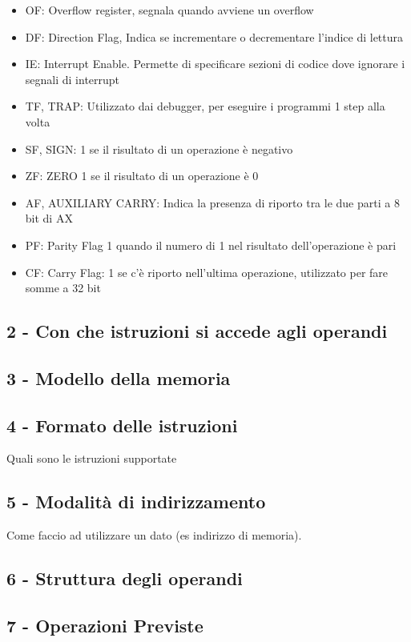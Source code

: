 \documentclass{article}
\begin{document}
\begin{itemize}
    \item OF:
        Overflow register, segnala quando avviene un overflow
    \item DF:
        Direction Flag, Indica se incrementare o decrementare l'indice di lettura
    \item IE:
        Interrupt Enable. Permette di specificare sezioni di codice dove ignorare i segnali di interrupt
    \item TF, TRAP:
        Utilizzato dai debugger, per eseguire i programmi 1 step alla volta
    \item SF, SIGN:
        1 se il risultato di un operazione è negativo
    \item ZF: ZERO
        1 se il risultato di un operazione è 0
    \item AF, AUXILIARY CARRY:
        Indica la presenza di riporto tra le due parti a 8 bit di AX
    \item PF: Parity Flag
        1 quando il numero di 1 nel risultato dell'operazione è pari
    \item CF: Carry Flag:
        1 se c'è riporto nell'ultima operazione, utilizzato per fare somme a 32 bit
\end{itemize}



\subsection{2 - Con che istruzioni si accede agli operandi}
\subsection{3 - Modello della memoria}
\subsection{4 - Formato delle istruzioni}
Quali sono le istruzioni supportate
\subsection{5 - Modalità di indirizzamento}
Come faccio ad utilizzare un dato (es indirizzo di memoria).
\subsection{6 - Struttura degli operandi}
\subsection{7 - Operazioni Previste}
\end{document}
